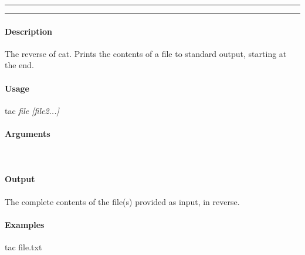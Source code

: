 \hrule
\vspace{1mm}
\hrule
\vspace{4mm}

\paragraph{Description}
\indentpar \raggedright \textrm{The reverse of cat. Prints the contents of a file to standard output, starting at the end.}\\

\paragraph{Usage}
\indentpar tac \textit{file [file2...]}

\paragraph{Arguments}
\indentpar {}\\
\indentpar {}

\paragraph{Output}
\indentpar \textrm{The complete contents of the file(s) provided as input, in reverse.}

\paragraph{Examples}

\indentpar tac file.txt

\vspace{20mm}